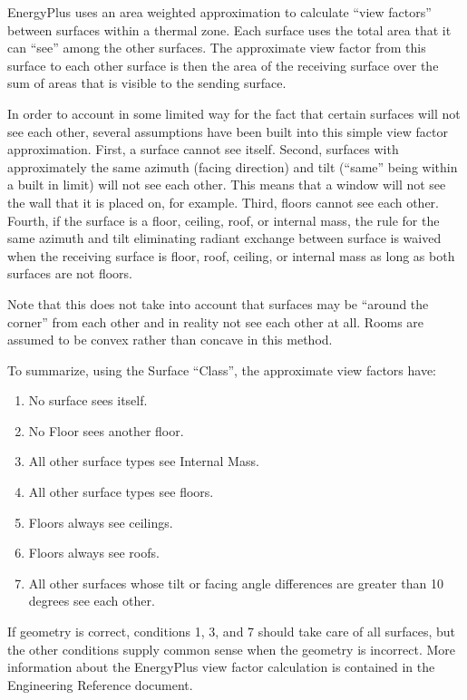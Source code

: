 EnergyPlus uses an area weighted approximation to calculate ``view factors'' between surfaces within a thermal zone. Each surface uses the total area that it can ``see'' among the other surfaces. The approximate view factor from this surface to each other surface is then the area of the receiving surface over the sum of areas that is visible to the sending surface.

In order to account in some limited way for the fact that certain surfaces will not see each other, several assumptions have been built into this simple view factor approximation. First, a surface cannot see itself. Second, surfaces with approximately the same azimuth (facing direction) and tilt (``same'' being within a built in limit) will not see each other. This means that a window will not see the wall that it is placed on, for example. Third, floors cannot see each other. Fourth, if the surface is a floor, ceiling, roof, or internal mass, the rule for the same azimuth and tilt eliminating radiant exchange between surface is waived when the receiving surface is floor, roof, ceiling, or internal mass as long as both surfaces are not floors.

Note that this does not take into account that surfaces may be ``around the corner'' from each other and in reality not see each other at all. Rooms are assumed to be convex rather than concave in this method.

To summarize, using the Surface ``Class'', the approximate view factors have:

\begin{enumerate}
\item
  No surface sees itself.
\item
  No Floor sees another floor.
\item
  All other surface types see Internal Mass.
\item
  All other surface types see floors.
\item
  Floors always see ceilings.
\item
  Floors always see roofs.
\item
  All other surfaces whose tilt or facing angle differences are greater than 10 degrees see each other.
\end{enumerate}

If geometry is correct, conditions 1, 3, and 7 should take care of all surfaces, but the other conditions supply common sense when the geometry is incorrect. More information about the EnergyPlus view factor calculation is contained in the Engineering Reference document.

